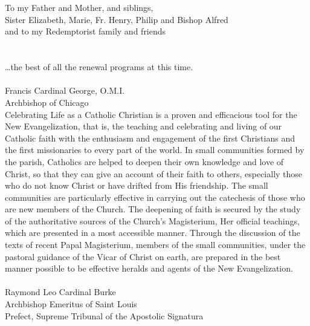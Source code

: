 \documentclass[oneside]{book}
\begin{document}

\section*{} 

\vspace*{\fill}
\begin{center}

To my Father and Mother, and siblings, \\
Sister Elizabeth, Marie, Fr. Henry, Philip and Bishop Alfred \\
and to my Redemptorist family and friends

\end{center}
\vspace*{\fill}
\pagebreak


\section*{} 

\ldots the best of all the renewal programs at this time.
\\ \\
Francis Cardinal George, O.M.I. \\
Archbishop of Chicago \\

Celebrating Life as a Catholic Christian is a proven and efficacious tool for
the New Evangelization, that is, the teaching and celebrating and living of our
Catholic faith with the enthusiasm and engagement of the first Christians and
the first missionaries to every part of the world.  In small communities formed
by the parish, Catholics are helped to deepen their own knowledge and love of
Christ, so that they can give an account of their faith to others, especially
those who do not know Christ or have drifted from His friendship.  The small
communities are particularly effective in carrying out the catechesis of those
who are new members of the Church.  The deepening of faith is secured by the
study of the authoritative sources of the Church's Magisterium, Her official
teachings, which are presented in a most accessible manner.  Through the
discussion of the texts of recent Papal Magisterium, members of the small
communities, under the pastoral guidance of the Vicar of Christ on earth, are
prepared in the best manner possible to be effective heralds and agents of the
New Evangelization.
\\ \\
Raymond Leo Cardinal Burke \\
Archbishop Emeritus of Saint Louis \\
Prefect, Supreme Tribunal of the Apostolic Signatura \\
\end{document}
